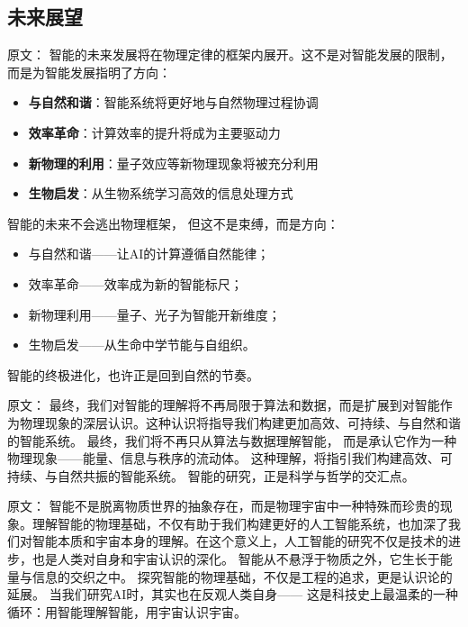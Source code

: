 \subsection{未来展望}

原文：
智能的未来发展将在物理定律的框架内展开。这不是对智能发展的限制，而是为智能发展指明了方向：
\begin{itemize}
\item \textbf{与自然和谐}：智能系统将更好地与自然物理过程协调
\item \textbf{效率革命}：计算效率的提升将成为主要驱动力
\item \textbf{新物理的利用}：量子效应等新物理现象将被充分利用
\item \textbf{生物启发}：从生物系统学习高效的信息处理方式
\end{itemize}
智能的未来不会逃出物理框架，  
但这不是束缚，而是方向：
\begin{itemize}
\item 与自然和谐——让AI的计算遵循自然能律；
\item 效率革命——效率成为新的智能标尺；
\item 新物理利用——量子、光子为智能开新维度；
\item 生物启发——从生命中学节能与自组织。
\end{itemize}
智能的终极进化，也许正是回到自然的节奏。

原文：
最终，我们对智能的理解将不再局限于算法和数据，而是扩展到对智能作为物理现象的深层认识。这种认识将指导我们构建更加高效、可持续、与自然和谐的智能系统。
最终，我们将不再只从算法与数据理解智能，  
而是承认它作为一种物理现象——能量、信息与秩序的流动体。  
这种理解，将指引我们构建高效、可持续、与自然共振的智能系统。  
智能的研究，正是科学与哲学的交汇点。

原文：
智能不是脱离物质世界的抽象存在，而是物理宇宙中一种特殊而珍贵的现象。理解智能的物理基础，不仅有助于我们构建更好的人工智能系统，也加深了我们对智能本质和宇宙本身的理解。在这个意义上，人工智能的研究不仅是技术的进步，也是人类对自身和宇宙认识的深化。
智能从不悬浮于物质之外，它生长于能量与信息的交织之中。  
探究智能的物理基础，不仅是工程的追求，更是认识论的延展。  
当我们研究AI时，其实也在反观人类自身——  
这是科技史上最温柔的一种循环：用智能理解智能，用宇宙认识宇宙。



